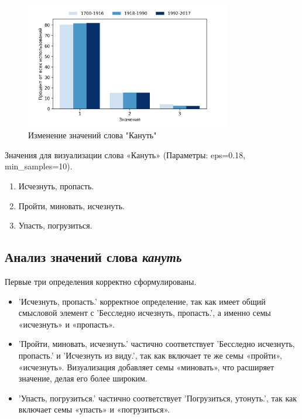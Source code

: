 \begin{figure}[H]
	\centering
	\includegraphics[width=0.8\textwidth]{img/visualizations/kanut'_minimal}
	\caption{Изменение значений слова "Кануть"}
	\label{fig:Кануть}
\end{figure}

Значения для визуализации слова «Кануть» (Параметры: eps=0.18, min\_samples=10).

\begin{enumerate}
    \item Исчезнуть, пропасть.
    \item Пройти, миновать, исчезнуть.
    \item Упасть, погрузиться.
\end{enumerate}

\subsection*{Анализ значений слова \textit{кануть}}

Первые три определения корректно сформулированы.

\begin{itemize}
    \item ’Исчезнуть, пропасть.’ корректное определение, так как имеет общий смысловой элемент с
’Бесследно исчезнуть, пропасть.’, а именно семы «исчезнуть» и «пропасть».

    \item ’Пройти, миновать, исчезнуть.’ частично соответствует
’Бесследно исчезнуть, пропасть.’ и ’Исчезнуть из виду.’, так как включает те же семы «пройти», «исчезнуть».
Визуализация добавляет семы «миновать», что расширяет значение, делая его более широким.

    \item ’Упасть, погрузиться.’ частично соответствует ’Погрузиться, утонуть.’,
так как включает семы «упасть» и «погрузиться».
\end{itemize}

